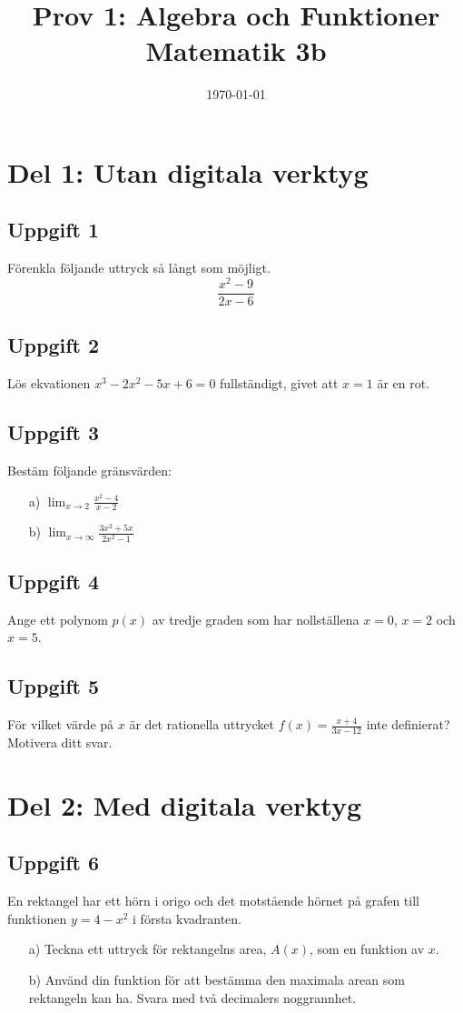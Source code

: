 \documentclass[12pt]{article}
\title{Prov 1: Algebra och Funktioner \\ \large Matematik 3b}
\author{}
\date{\today}
\begin{document}
\maketitle

\section*{Del 1: Utan digitala verktyg}

\subsection*{Uppgift 1}
Förenkla följande uttryck så långt som möjligt.
\[
\frac{x^2 - 9}{2x - 6}
\]

\subsection*{Uppgift 2}
Lös ekvationen $x^3 - 2x^2 - 5x + 6 = 0$ fullständigt, givet att $x=1$ är en rot.

\subsection*{Uppgift 3}
Bestäm följande gränsvärden:
\begin{enumerate}
    \item[a)] $\lim_{x \to 2} \frac{x^2 - 4}{x - 2}$
    \item[b)] $\lim_{x \to \infty} \frac{3x^2 + 5x}{2x^2 - 1}$
\end{enumerate}

\subsection*{Uppgift 4}
Ange ett polynom $p(x)$ av tredje graden som har nollställena $x=0$, $x=2$ och $x=5$.

\subsection*{Uppgift 5}
För vilket värde på $x$ är det rationella uttrycket $f(x) = \frac{x+4}{3x - 12}$ inte definierat? Motivera ditt svar.

\section*{Del 2: Med digitala verktyg}

\subsection*{Uppgift 6}
En rektangel har ett hörn i origo och det motstående hörnet på grafen till funktionen $y = 4 - x^2$ i första kvadranten. 
\begin{enumerate}
    \item[a)] Teckna ett uttryck för rektangelns area, $A(x)$, som en funktion av $x$.
    \item[b)] Använd din funktion för att bestämma den maximala arean som rektangeln kan ha. Svara med två decimalers noggrannhet.
\end{enumerate}
\end{document}
